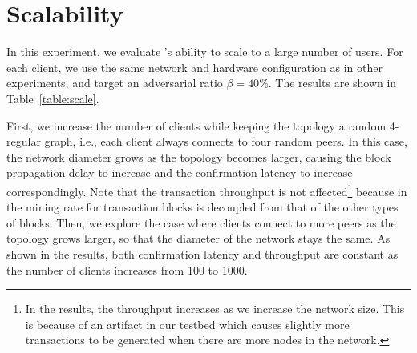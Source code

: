 
\section{Scalability}

\label{sec:eval-scale}
\begin{table}[ht]
	\centering
	\caption{\small Performance of \prism with different network topologies.}
	\label{table:scale}
	\end{table}

In this experiment, we evaluate \prism's ability to scale to a large number of users. For each client, we use the same network and hardware configuration as in other experiments, and target an adversarial ratio $\beta=40\%$. The results are shown in Table~\ref{table:scale}.

First, we increase the number of clients while keeping the topology a random 4-regular graph, i.e., each client always connects to four random peers. In this case, the network diameter grows as the topology becomes larger, causing the block propagation delay to increase and the confirmation latency to increase correspondingly. Note that the transaction throughput is not affected\footnote{In the results, the throughput increases as we increase the network size. This is because of an artifact in our testbed which causes slightly more transactions to be generated when there are more nodes in the network.} because in \prism the mining rate for transaction blocks is decoupled from that of the other types of blocks. Then, we explore the case where clients connect to more peers as the topology grows larger, so that the diameter of the network stays the same. As shown in the results, both confirmation latency and throughput are constant as the number of clients increases from 100 to 1000. 

